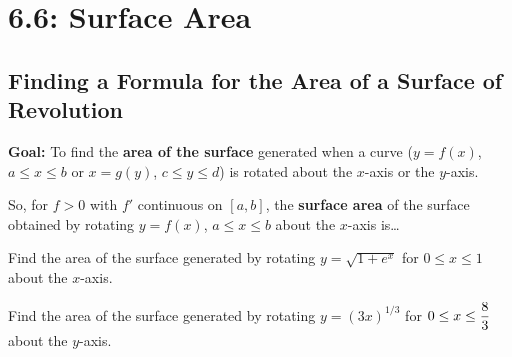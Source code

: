 \documentclass[12pt]{article}
\begin{document}
\section*{6.6: Surface Area}


\vspace{5mm}

\subsection*{Finding a Formula for the Area of a Surface of Revolution}

\textbf{Goal:} To find the \textbf{area of the surface} generated when a curve ($y=f(x)$, $a\leq x\leq b$ or $x=g(y)$, $c\leq y\leq d$) is rotated about the $x$-axis or the $y$-axis.

\vspace{100mm}

So, for $f>0$ with $f'$ continuous on $[a,b]$, the \textbf{surface area} of the surface obtained by rotating $y=f(x)$, $a\leq x\leq b$ about the $x$-axis is\dots

\newpage

\Example Find the area of the surface generated by rotating $y=\sqrt{1+e^x}$ for $0\leq x\leq 1$ about the $x$-axis.

\newpage

\Example Find the area of the surface generated by rotating $y=\left(3x\right)^{1/3}$ for $0\leq x \leq\displaystyle\frac{8}{3}$ about the $y$-axis.
\end{document}
